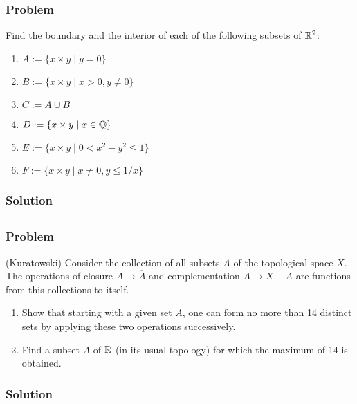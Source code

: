 \subsubsection{Problem}
Find the boundary and the interior of each of the following subsets of $\mathbb R^2$:
\begin{enumerate}
    \item $A := \{ x \times y \mid y = 0 \}$
    \item $B := \{ x \times y \mid x > 0, y \neq 0 \}$
    \item $C := A \cup B$
    \item $D := \{ x \times y \mid x \in \mathbb Q \}$
    \item $E := \{ x \times y \mid 0 < x^2-y^2 \leq 1 \}$
    \item $F := \{ x \times y \mid x \neq 0, y \leq 1/x \}$
\end{enumerate}
\subsubsection{Solution}
\todo


\setcounter{subsection}{20} %
\subsection{}

\subsubsection{Problem}
(Kuratowski) Consider the collection of all subsets $A$ of the topological space $X$. The operations of closure $A \to \overline{A}$ and complementation $A \to X-A$ are functions from this collections to itself.
\begin{enumerate}
    \item Show that starting with a given set $A$, one can form no more than 14 distinct sets by applying these two operations successively.
    \item Find a subset $A$ of $\mathbb R$ (in its usual topology) for which the maximum of 14 is obtained.
\end{enumerate}
\subsubsection{Solution}
\todo

